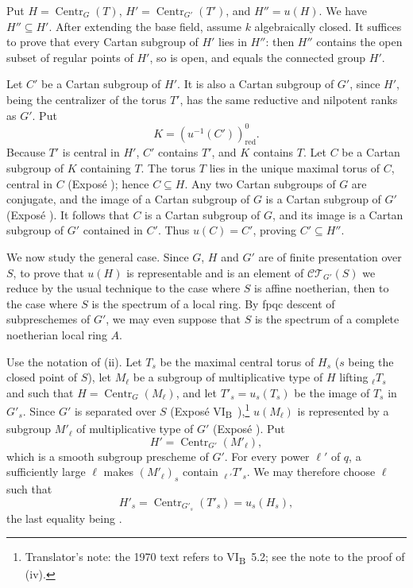 Put \(H=\operatorname{Centr}_G(T)\),
\(H'=\operatorname{Centr}_{G'}(T')\), and \(H''=u(H)\). We have
\(H''\subseteq H'\). After extending the base field, assume \(k\)
algebraically closed. It suffices to prove that every Cartan subgroup
of \(H'\) lies in \(H''\): then \(H''\) contains the open subset of
regular points of \(H'\), so is open, and equals the connected group
\(H'\).

Let \(C'\) be a Cartan subgroup of \(H'\). It is also a Cartan
subgroup of \(G'\), since \(H'\), being the centralizer of the torus
\(T'\), has the same reductive and nilpotent ranks as \(G'\). Put
\[
  K=(u^{-1}(C'))^0_{\mathrm{red}}.
\]
Because \(T'\) is central in \(H'\), \(C'\) contains \(T'\), and
\(K\) contains \(T\). Let \(C\) be a Cartan subgroup of \(K\)
containing \(T\). The torus \(T\) lies in the unique maximal torus of
\(C\), central in \(C\) (Exposé ); hence
\(C\subseteq H\). Any two Cartan subgroups of \(G\) are conjugate,
and the image of a Cartan subgroup of \(G\) is a Cartan subgroup of
\(G'\) (Exposé ). It follows that \(C\) is a Cartan subgroup
of \(G\), and its image is a Cartan subgroup of \(G'\) contained in
\(C'\). Thus \(u(C)=C'\), proving \(C'\subseteq H''\).

We now study the general case. Since \(G\), \(H\) and \(G'\) are of
finite presentation over \(S\), to prove that \(u(H)\) is representable and
is an element of \(\mathcal{CT}_{G'}(S)\) we reduce by the usual technique to
the case where \(S\) is affine noetherian, then to the case where \(S\) is the
spectrum of a local ring. By fpqc descent of subpreschemes of \(G'\), we may
even suppose that \(S\) is the spectrum of a complete noetherian local ring
\(A\).

Use the notation of (ii). Let \(T_s\) be the maximal central torus of
\(H_s\) (\(s\) being the closed point of \(S\)), let \(M_\ell\) be a subgroup
of multiplicative type of \(H\) lifting \({}_\ell T_s\) and such that
\(H=\operatorname{Centr}_G(M_\ell)\), and let \(T'_s=u_s(T_s)\) be the image of
\(T_s\) in \(G'_s\).
Since \(G'\) is separated over \(S\) (Exposé VI\textsubscript{B}~),\footnote{Translator's note: the 1970 text
refers to VI\textsubscript{B}~5.2; see the note to the proof of (iv).} \(u(M_\ell)\) is represented by a subgroup
\(M'_\ell\) of multiplicative type of \(G'\) (Exposé ). Put
\[
  H'=\operatorname{Centr}_{G'}(M'_\ell),
\]
which is a smooth subgroup prescheme of \(G'\). For every power \(\ell'\) of \(q\), a sufficiently
large \(\ell\) makes \((M'_\ell)_s\) contain
\({}_{\ell'}T'_s\). We may therefore choose \(\ell\) such that
\[
 H'_s=\operatorname{Centr}_{G'_s}(T'_s)=u_s(H_s),
\]
the last equality being .

